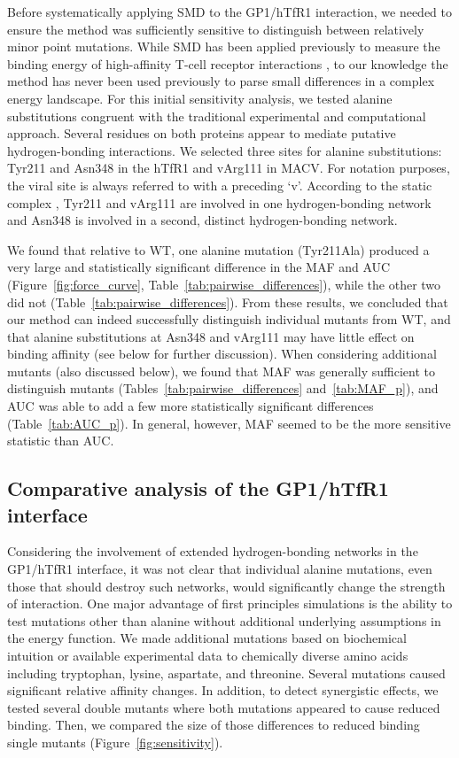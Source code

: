 \documentclass[12pt]{article}
\begin{document}
Before systematically applying SMD to the GP1/hTfR1 interaction, we needed to ensure the method was sufficiently sensitive to distinguish between relatively minor point mutations. While SMD has been applied previously to measure the binding energy of high-affinity T-cell receptor interactions \citep{Cuendet2008,Cuendet2011}, to our knowledge the method has never been used previously to parse small differences in a complex energy landscape. For this initial sensitivity analysis, we tested alanine substitutions congruent with the traditional experimental and computational approach. Several residues on both proteins appear to mediate putative hydrogen-bonding interactions. We selected three sites for alanine substitutions: Tyr211 and Asn348 in the hTfR1 and vArg111 in MACV. For notation purposes, the viral site is always referred to with a preceding `v'. According to the static complex \citep{Abraham2010}, Tyr211 and vArg111 are involved in one hydrogen-bonding network and Asn348 is involved in a second, distinct hydrogen-bonding network.

We found that relative to WT, one alanine mutation (Tyr211Ala) produced a very large and statistically significant difference in the MAF and AUC (Figure~\ref{fig:force_curve}, Table~\ref{tab:pairwise_differences}), while the other two did not (Table~\ref{tab:pairwise_differences}). From these results, we concluded that our method can indeed successfully distinguish individual mutants from WT, and that alanine substitutions at Asn348 and vArg111 may have little effect on binding affinity (see below for further discussion). When considering additional mutants (also discussed below), we found that MAF was generally sufficient to distinguish mutants (Tables~\ref{tab:pairwise_differences} and~\ref{tab:MAF_p}), and AUC was able to add a few more statistically significant differences (Table~\ref{tab:AUC_p}). In general, however, MAF seemed to be the more sensitive statistic than AUC.

\subsection*{Comparative analysis of the GP1/hTfR1 interface}

Considering the involvement of extended hydrogen-bonding networks in the GP1/hTfR1 interface, it was not clear that individual alanine mutations, even those that should destroy such networks, would significantly change the strength of interaction. One major advantage of first principles simulations is the ability to test mutations other than alanine without additional underlying assumptions in the energy function. We made additional mutations based on biochemical intuition or available experimental data to chemically diverse amino acids including tryptophan, lysine, aspartate, and threonine. Several mutations caused significant relative affinity changes. In addition, to detect synergistic effects, we tested several double mutants where both mutations appeared to cause reduced binding. Then, we compared the size of those differences to reduced binding single mutants (Figure~\ref{fig:sensitivity}).
\end{document}
